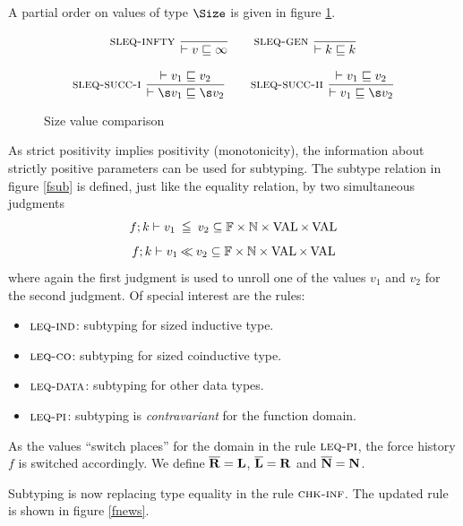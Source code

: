 A partial order on values of type $\Size$ is given in figure \ref{substage}. \begin{figure}[tp]
\begin{gather*}
\nru{\sleqinfty}
{}
{\SzLeq{v}{\infty}}
\qquad
\nru{\sleqgen}
{}
{\SzLeq{k}{k}}
\\[2ex]
\nru{\sleqsucci}
{\SzLeq{v_1}{v_2}}
{\SzLeq{\s v_1}{\s v_2}}
\qquad
\nru{\sleqsuccii}
{\SzLeq{v_1}{v_2}}
{\SzLeq{v_1}{\s v_2}}
\end{gather*}
\caption{Size value comparison}
\label{substage}
\end{figure} As strict positivity implies positivity (monotonicity), the information about strictly positive parameters can be used for subtyping. The subtype relation in figure \ref{fsub} is defined, just like the equality relation, by two simultaneous judgments
\[f;k\vdash v_1\:\leqq\:v_2 \subseteq \mathbb{F} \times \mathbb{N} \times \operatorname{VAL} \times \operatorname{VAL} \]
\[f;k\vdash v_1{\:\ll\:}v_2 \subseteq \mathbb{F} \times \mathbb{N} \times\operatorname{VAL} \times \operatorname{VAL} \]
where again the first judgment is used to unroll one of the values $v_1$ and $v_2$ for the second judgment.
Of special interest are the rules:
\begin{itemize}
\item
$\mbox{\sc leq-ind}$: subtyping for sized inductive type. 
\item
$\mbox{\sc leq-co}$: subtyping for sized coinductive type.
\item
$\mbox{\sc leq-data}$: subtyping for other data types.
\item
$\mbox{\sc leq-pi}$: subtyping is \emph{contravariant} for the function domain. 
\end{itemize}
As the values ``switch places'' for the domain in the rule $\mbox{\sc leq-pi}$, the force history $f$ is switched accordingly.
We define $\overline{\mathbf{R}}=\mathbf{L}$,  $\overline{\mathbf{L}}=\mathbf{R}$ and $\overline{\mathbf{N}}=\mathbf{N}$.

Subtyping is now replacing type equality in the rule $\mbox{\sc chk-inf}$. 
The updated rule is shown in figure \ref{fnews}.

